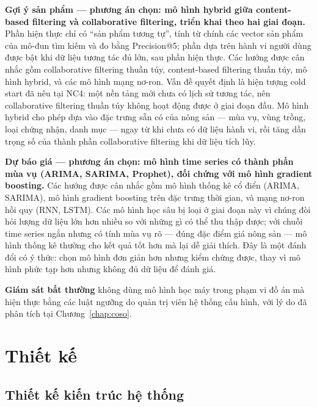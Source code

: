 \noindent\textbf{Gợi ý sản phẩm --- phương án chọn: mô hình hybrid giữa content-based filtering và collaborative filtering, triển khai theo hai giai đoạn.} Phần hiện thực chỉ có ``sản phẩm tương tự'', tính từ chính các vector sản phẩm của mô-đun tìm kiếm và đo bằng Precision@5; phần dựa trên hành vi người dùng được bật khi dữ liệu tương tác đủ lớn, sau phần hiện thực. Các hướng được cân nhắc gồm collaborative filtering thuần túy, content-based filtering thuần túy, mô hình hybrid, và các mô hình mạng nơ-ron. Vấn đề quyết định là hiện tượng cold start đã nêu tại NC4: một nền tảng mới chưa có lịch sử tương tác, nên collaborative filtering thuần túy không hoạt động được ở giai đoạn đầu. Mô hình hybrid cho phép dựa vào đặc trưng sẵn có của nông sản --- mùa vụ, vùng trồng, loại chứng nhận, danh mục --- ngay từ khi chưa có dữ liệu hành vi, rồi tăng dần trọng số của thành phần collaborative filtering khi dữ liệu tích lũy.

\noindent\textbf{Dự báo giá --- phương án chọn: mô hình time series có thành phần mùa vụ (ARIMA, SARIMA, Prophet), đối chứng với mô hình gradient boosting.} Các hướng được cân nhắc gồm mô hình thống kê cổ điển (ARIMA, SARIMA), mô hình gradient boosting trên đặc trưng thời gian, và mạng nơ-ron hồi quy (RNN, LSTM). Các mô hình học sâu bị loại ở giai đoạn này vì chúng đòi hỏi lượng dữ liệu lớn hơn nhiều so với những gì có thể thu thập được; với chuỗi time series ngắn nhưng có tính mùa vụ rõ --- đúng đặc điểm giá nông sản --- mô hình thống kê thường cho kết quả tốt hơn mà lại dễ giải thích. Đây là một đánh đổi có ý thức: chọn mô hình đơn giản hơn nhưng kiểm chứng được, thay vì mô hình phức tạp hơn nhưng không đủ dữ liệu để đánh giá.

\noindent\textbf{Giám sát bất thường} không dùng mô hình học máy trong phạm vi đồ án mà hiện thực bằng các luật ngưỡng do quản trị viên hệ thống cấu hình, với lý do đã phân tích tại Chương~\ref{chap:coso}.

\section{Thiết kế}
\label{sec:thietke}

\subsection{Thiết kế kiến trúc hệ thống}
\label{sec:kientruc}

